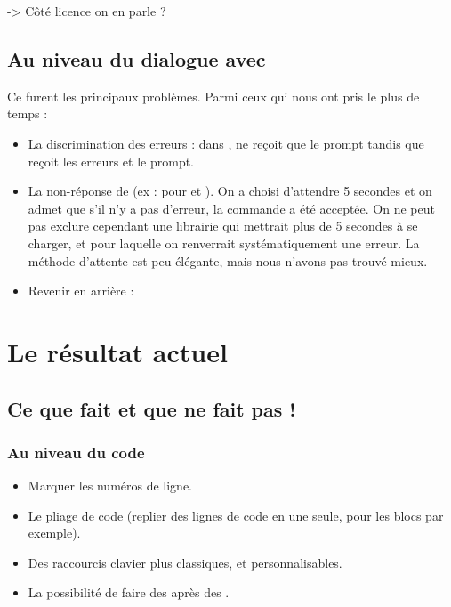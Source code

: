 
-> Côté licence on en parle ? %

\subsection{Au niveau du dialogue avec \Coq{}}

Ce furent les principaux problèmes. Parmi ceux qui nous ont pris le plus de temps :

\begin{itemize}
  \item La discrimination des erreurs : dans \coqtop{},  ne reçoit que le prompt tandis que  reçoit les erreurs et le prompt. 
  \item La non-réponse de \coqtop{} (ex : pour  et ). On a choisi d'attendre 5 secondes et on admet que s'il n'y a pas d'erreur, la commande a été acceptée. On ne peut pas exclure cependant une librairie qui mettrait plus de 5 secondes à se charger, et pour laquelle on renverrait systématiquement une erreur. La méthode d'attente est peu élégante, mais nous n'avons pas trouvé mieux.
  \item Revenir en arrière : 
\end{itemize}

        
\section{Le résultat actuel}

\subsection{Ce que \CoquilleIDE{} fait et que \CoqIde{} ne fait pas !}

\subsubsection{Au niveau du code}

\begin{itemize}
  \item Marquer les numéros de ligne.
  \item Le pliage de code (replier des lignes de code en une seule, pour les blocs {} par exemple).
  \item Des raccourcis clavier plus classiques, et personnalisables.
  \item La possibilité de faire des  après des .
\end{itemize}

